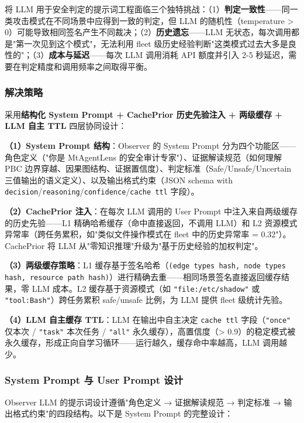 \documentclass[a4paper]{ctexart}
\makeatletter
\renewcommand{\_}{%
  \ifmmode
    \nfss@text{\textunderscore}%
  \else
    \textunderscore\discretionary{}{}{}%
  \fi}
\makeatother
\begin{document}
将 LLM 用于安全判定的提示词工程面临三个独特挑战：（1）\textbf{判定一致性}——同一类攻击模式在不同场景中应得到一致的判定，但 LLM 的随机性（temperature > 0）可能导致相同签名产生不同裁决；（2）\textbf{历史遗忘}——LLM 无状态，每次调用都是"第一次见到这个模式"，无法利用 fleet 级历史经验判断"这类模式过去大多是良性的"；（3）\textbf{成本与延迟}——每次 LLM 调用消耗 API 额度并引入 2-5 秒延迟，需要在判定精度和调用频率之间取得平衡。


\subsubsection{解决策略}



采用\textbf{结构化 System Prompt + CachePrior 历史先验注入 + 两级缓存 + LLM 自主 TTL} 四层协同设计：


\textbf{（1）System Prompt 结构}：Observer 的 System Prompt 分为四个功能区——角色定义（"你是 MtAgentLens 的安全审计专家"）、证据解读规范（如何理解 PBC 边界穿越、因果图结构、证据置信度）、判定标准（Safe/Unsafe/Uncertain 三值输出的语义定义）、以及输出格式约束（JSON schema with \texttt{decision}/\texttt{reasoning}/\texttt{confidence}/\texttt{cache\_ttl} 字段）。


\textbf{（2）CachePrior 注入}：在每次 LLM 调用的 User Prompt 中注入来自两级缓存的历史先验——L1 精确哈希缓存（命中直接返回，不调用 LLM）和 L2 资源模式异常率（跨任务累积，如"类似文件操作模式在 fleet 中的历史异常率 = 0.32"）。CachePrior 将 LLM 从"零知识推理"升级为"基于历史经验的加权判定"。


\textbf{（3）两级缓存策略}：L1 缓存基于签名哈希（\texttt{(edge\_types\_hash, node\_types\_hash, resource\_path\_hash)}）进行精确去重——相同场景签名直接返回缓存结果，零 LLM 成本。L2 缓存基于资源模式（如 \texttt{"file:/etc/shadow"} 或 \texttt{"tool:Bash"}）跨任务累积 safe/unsafe 比例，为 LLM 提供 fleet 级统计先验。


\textbf{（4）LLM 自主缓存 TTL}：LLM 在输出中自主决定 \texttt{cache\_ttl} 字段（\texttt{"once"} 仅本次 / \texttt{"task"} 本次任务 / \texttt{"all"} 永久缓存），高置信度（> 0.9）的稳定模式被永久缓存，形成正向自学习循环——运行越久，缓存命中率越高，LLM 调用越少。


\subsubsection{System Prompt 与 User Prompt 设计}



Observer LLM 的提示词设计遵循"角色定义 → 证据解读规范 → 判定标准 → 输出格式约束"的四段结构。以下是 System Prompt 的完整设计：
\end{document}
